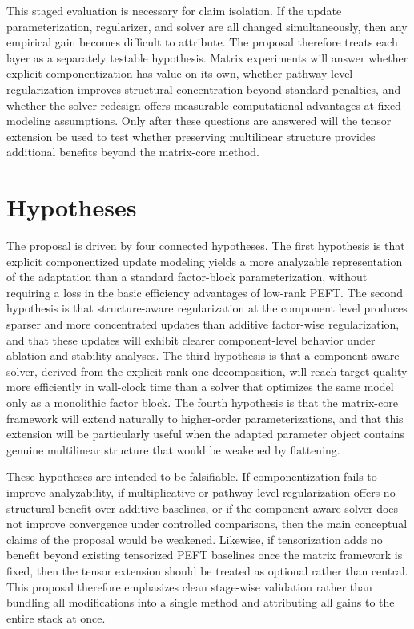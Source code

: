 \documentclass[11pt]{article}
\begin{document}
This staged evaluation is necessary for claim isolation. If the update parameterization, regularizer, and solver are all changed simultaneously, then any empirical gain becomes difficult to attribute. The proposal therefore treats each layer as a separately testable hypothesis. Matrix experiments will answer whether explicit componentization has value on its own, whether pathway-level regularization improves structural concentration beyond standard penalties, and whether the solver redesign offers measurable computational advantages at fixed modeling assumptions. Only after these questions are answered will the tensor extension be used to test whether preserving multilinear structure provides additional benefits beyond the matrix-core method.

\section{Hypotheses}

The proposal is driven by four connected hypotheses. The first hypothesis is that explicit componentized update modeling yields a more analyzable representation of the adaptation than a standard factor-block parameterization, without requiring a loss in the basic efficiency advantages of low-rank PEFT. The second hypothesis is that structure-aware regularization at the component level produces sparser and more concentrated updates than additive factor-wise regularization, and that these updates will exhibit clearer component-level behavior under ablation and stability analyses. The third hypothesis is that a component-aware solver, derived from the explicit rank-one decomposition, will reach target quality more efficiently in wall-clock time than a solver that optimizes the same model only as a monolithic factor block. The fourth hypothesis is that the matrix-core framework will extend naturally to higher-order parameterizations, and that this extension will be particularly useful when the adapted parameter object contains genuine multilinear structure that would be weakened by flattening.

These hypotheses are intended to be falsifiable. If componentization fails to improve analyzability, if multiplicative or pathway-level regularization offers no structural benefit over additive baselines, or if the component-aware solver does not improve convergence under controlled comparisons, then the main conceptual claims of the proposal would be weakened. Likewise, if tensorization adds no benefit beyond existing tensorized PEFT baselines once the matrix framework is fixed, then the tensor extension should be treated as optional rather than central. This proposal therefore emphasizes clean stage-wise validation rather than bundling all modifications into a single method and attributing all gains to the entire stack at once.
\end{document}
